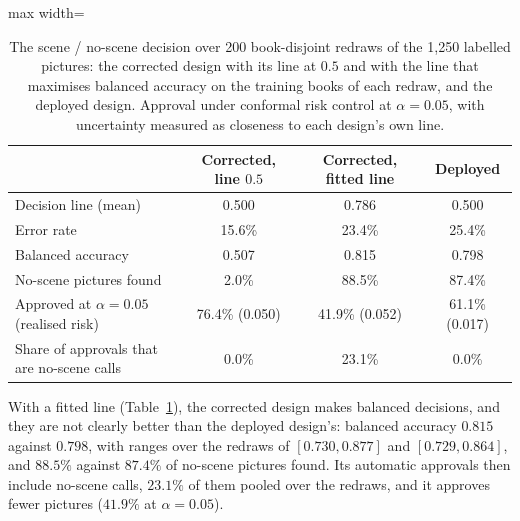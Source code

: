 \begin{table}[!htbp]
\centering
\caption[The scene / no-scene decision line]{The scene / no-scene decision over 200 book-disjoint redraws of the 1,250 labelled pictures: the corrected design with its line at $0.5$ and with the line that maximises balanced accuracy on the training books of each redraw, and the deployed design. Approval under conformal risk control at $\alpha=0.05$, with uncertainty measured as closeness to each design's own line.}
\label{tab:decision_line}
\small
\begin{adjustbox}{max width=\textwidth}
\begin{tabular}{lccc}
\toprule
 & Corrected, line $0.5$ & Corrected, fitted line & Deployed \\
\midrule
Decision line (mean) & 0.500 & 0.786 & 0.500 \\
Error rate & 15.6\% & 23.4\% & 25.4\% \\
Balanced accuracy & 0.507 & 0.815 & 0.798 \\
No-scene pictures found & 2.0\% & 88.5\% & 87.4\% \\
Approved at $\alpha=0.05$ (realised risk) & 76.4\% (0.050) & 41.9\% (0.052) & 61.1\% (0.017) \\
Share of approvals that are no-scene calls & 0.0\% & 23.1\% & 0.0\% \\
\bottomrule
\end{tabular}
\end{adjustbox}
\end{table}

With a fitted line (Table~\ref{tab:decision_line}), the corrected design makes balanced decisions, and they are not clearly better than the deployed design's: balanced accuracy $0.815$ against $0.798$, with ranges over the redraws of $[0.730, 0.877]$ and $[0.729, 0.864]$, and $88.5\%$ against $87.4\%$ of no-scene pictures found. Its automatic approvals then include no-scene calls, $23.1\%$ of them pooled over the redraws, and it approves fewer pictures ($41.9\%$ at $\alpha=0.05$).

